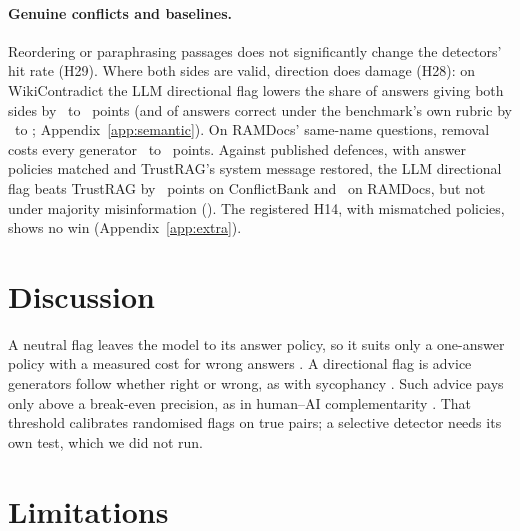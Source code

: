 \paragraph{Genuine conflicts and baselines.} Reordering \citep{liu2024lost} or paraphrasing passages does not significantly
change the detectors' hit rate (H29). Where both sides are valid, direction does damage (H28): on WikiContradict the LLM directional
flag lowers the share of answers giving both sides by \ahTwentyEightWcMiniDir\ to \ahTwentyEightWcLunaDir\ points
(and of answers correct under the benchmark's own rubric by \awikiOrigMiniEffPt\ to \awikiOrigLunaEffPt;
Appendix~\ref{app:semantic}). On RAMDocs' same-name questions, removal costs every generator
\ahTwentyEightAmbMiniRem\ to \ahTwentyEightAmbLunaRem\ points. Against published defences, with answer policies matched and TrustRAG's
system message restored, the LLM directional flag beats TrustRAG by \blHFourteenCbs\ points on ConflictBank and
\blHFourteenRd\ on RAMDocs, but not under majority misinformation (\blHFourteenMj). The registered H14, with
mismatched policies, shows no win (Appendix~\ref{app:extra}).
\section{Discussion}
\label{sec:discussion}

A neutral flag leaves the model to its answer policy, so it suits only a one-answer policy with a measured cost for
wrong answers \citep{wen2025abstention}. A directional flag is advice generators follow whether
right or wrong, as with sycophancy \citep{sharma2024sycophancy}. Such advice pays only above a break-even precision, as in
human--AI complementarity \citep{bansal2021accurate,mozannar2020defer}. That threshold calibrates randomised flags on
true pairs; a selective detector needs its own test, which we did not run.
\section*{Limitations}

